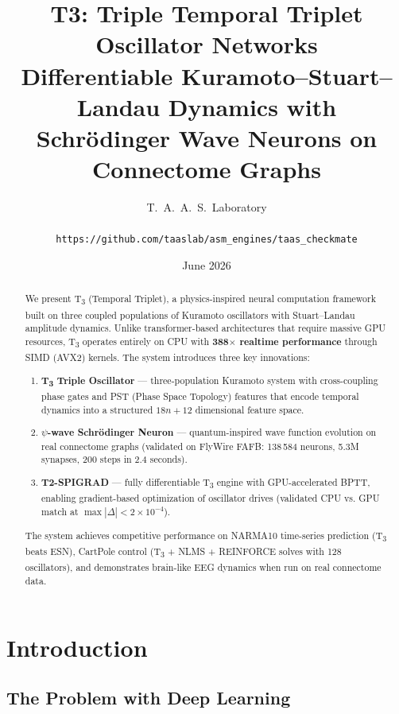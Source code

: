 \documentclass[twocolumn,10pt]{article}
\title{T3: Triple Temporal Triplet Oscillator Networks\\\large Differentiable Kuramoto--Stuart--Landau Dynamics with Schr\"odinger Wave Neurons on Connectome Graphs}
\author{T.~A.~A.~S.~Laboratory\\\\
\texttt{https://github.com/taaslab/asm\_engines/taas\_checkmate}}
\date{June 2026}
\newcommand{\Tthree}{T\textsubscript{3}}
\newcommand{\psiwave}{$\psi$-wave}
\begin{document}
\maketitle

\begin{abstract}
We present \Tthree{} (Temporal Triplet), a physics-inspired neural computation framework built on three coupled populations of Kuramoto oscillators with Stuart--Landau amplitude dynamics. Unlike transformer-based architectures that require massive GPU resources, \Tthree{} operates entirely on CPU with \textbf{388$\times$ realtime performance} through SIMD (AVX2) kernels. The system introduces three key innovations:

\begin{enumerate}
  \item \textbf{\Tthree{} Triple Oscillator} --- three-population Kuramoto system with cross-coupling phase gates and PST (Phase Space Topology) features that encode temporal dynamics into a structured $18n+12$ dimensional feature space.
  \item \textbf{\psiwave{} Schr\"odinger Neuron} --- quantum-inspired wave function evolution on real connectome graphs (validated on FlyWire FAFB: 138\,584 neurons, 5.3M synapses, 200 steps in 2.4 seconds).
  \item \textbf{T2-SPIGRAD} --- fully differentiable \Tthree{} engine with GPU-accelerated BPTT, enabling gradient-based optimization of oscillator drives (validated CPU vs. GPU match at $\max|\Delta| < 2\times10^{-4}$).
\end{enumerate}

The system achieves competitive performance on NARMA10 time-series prediction (\Tthree{} beats ESN), CartPole control (\Tthree{} + NLMS + REINFORCE solves with 128 oscillators), and demonstrates brain-like EEG dynamics when run on real connectome data.
\end{abstract}

\section{Introduction}

\subsection{The Problem with Deep Learning}
\end{document}
